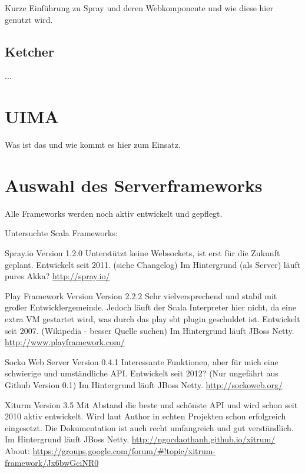 Kurze Einführung zu Spray und deren Webkomponente und wie diese hier genutzt
wird.

\subsection{Ketcher}

...


\section{UIMA}

Was ist das und wie kommt es hier zum Einsatz.


\section{Auswahl des Serverframeworks}                         \label{sec.server}

Alle Frameworks werden noch aktiv entwickelt und gepflegt.

Untersuchte Scala Frameworks:

Spray.io Version 1.2.0
Unterstützt keine Websockets, ist erst für die Zukunft geplant.
Entwickelt seit 2011. (siehe Changelog)
Im Hintergrund (als Server) läuft pures Akka?
\url{http://spray.io/}

Play Framework Version Version 2.2.2
Sehr vielversprechend und stabil mit großer Entwicklergemeinde.
Jedoch läuft der Scala Interpreter hier nicht, da eine extra VM gestartet
wird, was durch das play sbt plugin geschuldet ist.
Entwickelt seit 2007. (Wikipedia - besser Quelle suchen)
Im Hintergrund läuft JBoss Netty.
\url{http://www.playframework.com/}

Socko Web Server Version 0.4.1
Interessante Funktionen, aber für mich eine schwierige und umständliche API.
Entwickelt seit 2012? (Nur ungefährt aus Github Version 0.1)
Im Hintergrund läuft JBoss Netty.
\url{http://sockoweb.org/}

Xiturm Version 3.5
Mit Abstand die beste und schönste API und wird schon seit 2010 aktiv entwickelt.
Wird laut Author in echten Projekten schon erfolgreich eingesetzt.
Die Dokumentation ist auch recht umfangreich und gut verständlich.
Im Hintergrund läuft JBoss Netty.
\url{http://ngocdaothanh.github.io/xitrum/}
About: \url{https://groups.google.com/forum/#!topic/xitrum-framework/Jx6bwGciNR0}



